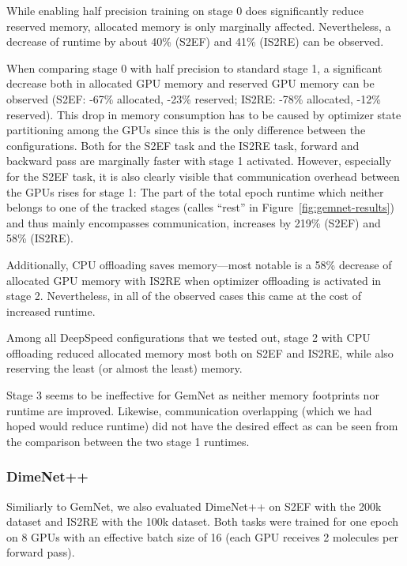 While enabling half precision training on stage 0 does significantly reduce 
reserved memory, allocated memory is only marginally affected. Nevertheless, 
a decrease of runtime by about 40\% (S2EF) and 41\% (IS2RE) can be observed.

When comparing stage 0 with half precision to standard stage 1, a significant decrease
both in allocated GPU memory and reserved GPU memory can be observed
(S2EF: -67\% allocated, -23\% reserved; IS2RE: -78\% allocated, -12\% reserved).
This drop in memory consumption has to be caused by optimizer state partitioning among
the GPUs since this is the only difference between the configurations. 
Both for the S2EF task and the IS2RE task, forward and backward pass 
are marginally faster with stage 1 activated. 
However, especially for the S2EF task, it is also clearly visible that communication overhead 
between the GPUs rises for stage 1: The part of the total epoch runtime which
neither belongs to one of the tracked stages (calles \enquote{rest} in 
Figure~\ref{fig:gemnet-results}) and thus mainly 
encompasses communication, increases by 219\% (S2EF) and 58\% (IS2RE).

Additionally, CPU offloading saves memory---most notable is a 58\% decrease of allocated GPU 
memory with IS2RE when optimizer offloading is activated in stage 2. 
Nevertheless, in all of the observed cases this came at the cost of increased runtime.

Among all DeepSpeed configurations that we tested out, stage 2 with CPU offloading 
reduced allocated memory most both on S2EF and IS2RE, while also reserving the least 
(or almost the least) memory.

Stage 3 seems to be ineffective for GemNet as neither memory footprints nor 
runtime are improved. Likewise, communication overlapping (which we had hoped would
reduce runtime) did not have the desired effect as can be seen from the comparison 
between the two stage 1 runtimes.

\subsubsection{DimeNet++}

Similiarly to GemNet, we also evaluated DimeNet++ on S2EF with the 200k dataset and 
IS2RE with the 100k dataset. Both tasks were trained for one epoch on 8 GPUs with 
an effective batch size of 16 (each GPU receives 2 molecules per forward pass). 

